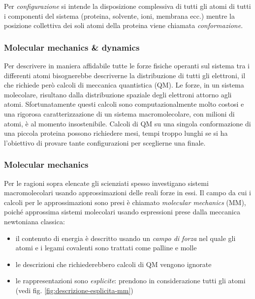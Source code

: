 {Per \textit{configurazione} si intende la disposizione complessiva di tutti gli atomi di tutti i componenti del sistema (proteina, solvente, ioni, membrana ecc.) mentre la posizione collettiva dei soli atomi della proteina viene chiamata \textit{conformazione}.

\subsubsection{Molecular mechanics \& dynamics}

\par Per descrivere in maniera affidabile tutte le forze fisiche operanti sul sistema tra i differenti atomi bisognerebbe descriverne la distribuzione di tutti gli elettroni, il che richiede però calcoli di meccanica quantistica (QM). Le forze, in un sistema molecolare, risultano dalla distribuzione spaziale degli elettroni attorno agli atomi. Sfortunatamente questi calcoli sono computazionalmente molto costosi e una rigorosa caratterizzazione di un sistema macromolecolare, con milioni di atomi, è al momento insostenibile. Calcoli di QM su una singola conformazione di una piccola proteina possono richiedere mesi, tempi troppo lunghi se si ha l'obiettivo di provare tante configurazioni per sceglierne una finale. 

\subsubsection{Molecular mechanics}

\par Per le ragioni sopra elencate gli scienziati spesso investigano sistemi macromolecolari usando approssimazioni delle reali forze in essi. Il campo da cui i calcoli per le approssimazioni sono presi è chiamato \textit{molecular mechanics} (MM), poiché approssima sistemi molecolari usando espressioni prese dalla meccanica newtoniana classica:
\begin{itemize}
	\item il contenuto di energia è descritto usando un \textit{campo di forza} nel quale gli atomi e i legami covalenti sono trattati come palline e molle
	\item le descrizioni che richiederebbero calcoli di QM vengono ignorate
	\item le rappresentazioni sono \textit{esplicite}: prendono in considerazione tutti gli atomi (vedi fig. \ref{fig:descrizione-esplicita-mm})
\end{itemize}

}
